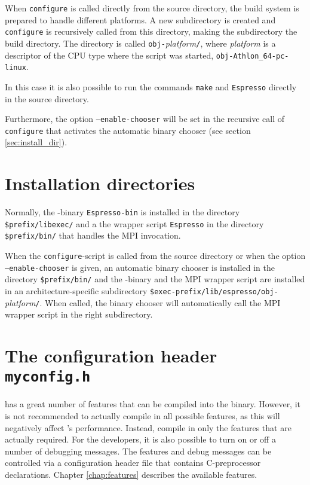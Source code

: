 When \texttt{configure} is called directly from the source directory,
the \es{} build system is prepared to handle different platforms.  A
new subdirectory is created and \texttt{configure} is recursively
called from this directory, making the subdirectory the build
directory.  The directory is called
\texttt{obj-}\textit{platform}\texttt{/}, where \textit{platform} is a
descriptor of the CPU type where the script was started, \eg{}
\texttt{obj-Athlon\_64-pc-linux}.

In this case it is also possible to run the commands \texttt{make} and
\texttt{Espresso} directly in the source directory.

Furthermore, the option \texttt{--enable-chooser} will be set in the
recursive call of \texttt{configure} that activates the automatic
binary chooser (see section \vref{sec:install_dir}).

\section{Installation directories}
\label{sec:install_dir}

Normally, the \es-binary \texttt{Espresso-bin} is installed in the
directory \texttt{\$prefix/libexec/} and a the wrapper script
\texttt{Espresso} in the directory \texttt{\$prefix/bin/} that handles
the MPI invocation.

When the \texttt{configure}-script is called from the source directory
or when the option \texttt{--enable-chooser} is given, an automatic
binary chooser is installed in the directory \texttt{\$prefix/bin/}
and the \es{}-binary and the MPI wrapper script are installed in an
architecture-specific subdirectory
\mbox{\texttt{\$exec-prefix/lib/espresso/obj-}\textit{platform}\texttt{/}}.
When called, the binary chooser will automatically call the MPI
wrapper script in the right subdirectory.

\section{The configuration header \texttt{myconfig.h}}
\label{sec:myconfig}

  \es{} has a great
number of features that can be compiled into the binary. However, it
is not recommended to actually compile in all possible features, as
this will negatively affect \es's performance. Instead, compile in
only the features that are actually required. For the developers, it
is also possible to turn on or off a number of debugging messages. The
features and debug messages can be controlled via a configuration
header file that contains C-preprocessor declarations. Chapter
\vref{chap:features} describes the available features.

